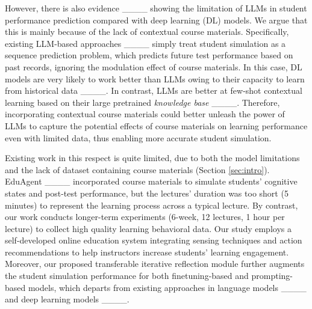 However, there is also evidence ____ showing the 
limitation of LLMs in student performance prediction compared with deep learning (DL) models. We argue that this is mainly because of the lack of contextual course materials. Specifically, existing LLM-based approaches ____ simply treat student simulation as a sequence prediction problem, which predicts future test performance based on past records, ignoring the modulation effect of course materials. In this case, DL models are very likely to work better than LLMs owing to their capacity to learn from historical data ____. In contrast, LLMs are better at few-shot contextual learning based on their large pretrained \textit{knowledge base} ____. Therefore, incorporating contextual course materials could better unleash the power of LLMs to capture the potential effects of course materials on learning performance even with limited data, thus enabling more accurate student simulation.

Existing work in this respect is quite limited, due to both the model limitations and the lack of dataset containing course materials (Section \ref{sec:intro}). 
EduAgent ____ incorporated course materials to simulate students' cognitive states and post-test performance, but the lectures' duration was too short (5 minutes) to represent the learning process across a typical lecture. By contrast, our work conducts longer-term experiments (6-week, 12 lectures, 1 hour per lecture) to collect high quality learning behavioral data. Our study employs a self-developed online education system integrating sensing techniques and action recommendations to help instructors increase students' learning engagement. Moreover, our proposed transferable iterative reflection module further augments the student simulation performance for both finetuning-based and prompting-based models, which departs from existing approaches in language models ____ and deep learning models ____.



